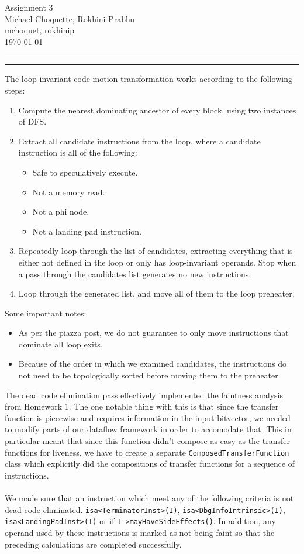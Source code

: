 \documentclass[11pt]{article}
\newcounter{questionCounter}
\newcounter{partCounter}[questionCounter]
\newenvironment{question}[2][\arabic{questionCounter}]{%
    \setcounter{partCounter}{0}%
    \vspace{.25in} \hrule \vspace{0.5em}%
        \noindent{\bf #2}%
    \vspace{0.8em} \hrule \vspace{.10in}%
    \addtocounter{questionCounter}{1}%
}{}
\newcommand{\myname}{Michael Choquette, Rokhini Prabhu}
\newcommand{\myandrew}{mchoquet, rokhinip}
\newcommand{\myhwname}{Assignment 3}
\begin{document}
\thispagestyle{plain}

\begin{center}
{\Large \myhwname} \\
\myname \\
\myandrew \\
\today
\end{center}

\begin{question}{Implementation Notes}

The loop-invariant code motion transformation works according to the following steps:
\begin{enumerate}
\item	Compute the nearest dominating ancestor of every block, using two instances of DFS.
\item	Extract all candidate instructions from the loop, where a candidate instruction is all of the following:
	\begin{itemize}
	\item Safe to speculatively execute.
	\item Not a memory read.
	\item	Not a phi node.
	\item	Not a landing pad instruction.
	\end{itemize}
\item Repeatedly loop through the list of candidates, extracting everything that is either not defined in the loop or only has loop-invariant operands. Stop when a pass through the candidates list generates no new instructions.
\item Loop through the generated list, and move all of them to the loop preheater.
\end{enumerate}
Some important notes:
\begin{itemize}
\item	As per the piazza post, we do not guarantee to only move instructions that dominate all loop exits.
\item	Because of the order in which we examined candidates, the instructions do not need to be topologically sorted before moving them to the preheater.
\end{itemize}

The dead code elimination pass effectively implemented the faintness analysis
from Homework 1. The one notable thing with this is that since the transfer
function is piecewise and requires information in the input bitvector, we
needed to modify parts of our dataflow framework in order to accomodate that.
This in particular meant that since this function didn't compose as easy as the
transfer functions for liveness, we have to create a separate
\texttt{ComposedTransferFunction} class which explicitly did the compositions of
transfer functions for a sequence of instructions. 
\\
\\We made sure that an instruction which meet any of the following criteria is not
dead code eliminated. \texttt{isa<TerminatorInst>(I)},
\texttt{isa<DbgInfoIntrinsic>(I)}, \texttt{isa<LandingPadInst>(I)} or if
\texttt{I->mayHaveSideEffects()}. In addition, any operand used by these
instructions is marked as not being faint so that the preceding calculations are
completed successfully.


\end{question}
\end{document}
